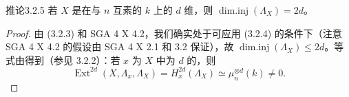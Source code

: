 \begin{SGAresult}{推论}{3.2.5}
若 $X$ 是在与 $n$ 互素的 $k$ 上的 $d$ 维，则 $\operatorname{dim.inj}(\Lambda_X)=2d$。
\end{SGAresult}
\begin{proof}
由 (3.2.3) 和 SGA 4 X 4.2，我们确实处于可应用 (3.2.4) 的条件下（注意 SGA 4 X 4.2 的假设由 SGA 4 X 2.1 和 3.2 保证），故 $\operatorname{dim.inj}(\Lambda_X)\leq2d$。等式由得到（参见 3.2.2）：若 $x$ 为 $X$ 中为 $d$ 的，则
\[
\operatorname{Ext}^{2d}(X,\Lambda_x,\Lambda_X)=H_x^{2d}(\Lambda_X)\simeq\mu_n^{\otimes d}(k)\ne0.
\]
\end{proof}

